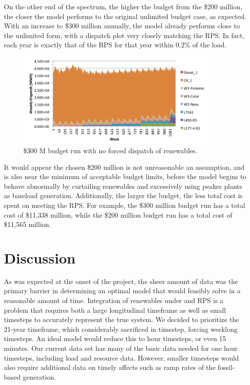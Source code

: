 \documentclass[12pt,letterpaper,fleqn]{article}
\begin{document}
On the other end of the spectrum, the higher the budget from the \$200
million, the closer the model performs to the original unlimited
budget case, as expected. With an increase to \$300 million annually,
the model already performs close to the unlimited form, with a
dispatch plot very closely matching the RPS. In fact, each year is
exactly that of the RPS for that year within 0.2\% of the load.

\begin{figure}[!h]
  \centering
  \includegraphics[width=0.9\textwidth]{img/budget_300_not_forced}
  \caption{\$300 M budget run with no forced dispatch of renewables.}
  \label{fig:budget_300_not_forced}
\end{figure}

It would appear the chosen \$200 million is not unreasonable an
assumption, and is also near the minimum of acceptable budget limits,
before the model begins to behave abnormally by curtailing renewables
and excessively using peaker plants as baseload
generation. Additionally, the larger the budget, the less total cost
is spent on meeting the RPS. For example, the \$300 million budget run
has a total cost of \$11,338 million, while the \$200 million budget
run has a total cost of \$11,565 million.

\section{Discussion}

As was expected at the onset of the project, the sheer amount of data
was the primary barrier in determining an optimal model that would
feasibly solve in a reasonable amount of time. Integration of
renewables under and RPS is a problem that requires both a large
longitudinal timeframe as well as small timesteps to accurately
represent the true system. We decided to prioritize the 21-year
timeframe, which considerably sacrificed in timestep, forcing weeklong
timesteps. An ideal model would reduce this to hour timesteps, or even
15 minutes. Our current data set has many of the basic data needed for
one hour timesteps, including load and resource data. However, smaller
timesteps would also require additional data on timely affects such as
ramp rates of the fossil-based generation. 
\end{document}
